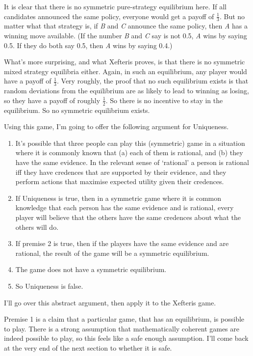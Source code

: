 \documentclass[
  12pt,
  letterpaper,
  DIV=11,
  numbers=noendperiod]{scrreprt}
\providecommand{\tightlist}{%
  \setlength{\itemsep}{0pt}\setlength{\parskip}{0pt}}\usepackage{longtable,booktabs,array}
\begin{document}
It is clear that there is no symmetric pure-strategy equilibrium here.
If all candidates announced the same policy, everyone would get a payoff
of \(\frac{1}{3}\). But no matter what that strategy is, if \emph{B} and
\emph{C} announce the same policy, then \emph{A} has a winning move
available. (If the number \emph{B} and \emph{C} say is not 0.5, \emph{A}
wins by saying 0.5. If they do both say 0.5, then \emph{A} wins by
saying 0.4.)

What's more surprising, and what Xefteris proves, is that there is no
symmetric mixed strategy equilibria either. Again, in such an
equilibrium, any player would have a payoff of \(\frac{1}{3}\). Very
roughly, the proof that no such equilibrium exists is that random
deviations from the equilibrium are as likely to lead to winning as
losing, so they have a payoff of roughly \(\frac{1}{2}\). So there is no
incentive to stay in the equilibrium. So no symmetric equilibrium
exists.

Using this game, I'm going to offer the following argument for
Uniqueness.

\begin{enumerate}
\def\labelenumi{\arabic{enumi}.}
\tightlist
\item
  It's possible that three people can play this (symmetric) game in a
  situation where it is commonly known that (a) each of them is
  rational, and (b) they have the same evidence. In the relevant sense
  of `rational' a person is rational iff they have credences that are
  supported by their evidence, and they perform actions that maximise
  expected utility given their credences.
\item
  If Uniqueness is true, then in a symmetric game where it is common
  knowledge that each person has the same evidence and is rational,
  every player will believe that the others have the same credences
  about what the others will do.
\item
  If premise 2 is true, then if the players have the same evidence and
  are rational, the result of the game will be a symmetric equilibrium.
\item
  The game does not have a symmetric equilibrium.
\item
  So Uniqueness is false.
\end{enumerate}

I'll go over this abstract argument, then apply it to the Xefteris game.

Premise 1 is a claim that a particular game, that has an equilibrium, is
possible to play. There is a strong assumption that mathematically
coherent games are indeed possible to play, so this feels like a safe
enough assumption. I'll come back at the very end of the next section to
whether it is safe.
\end{document}
